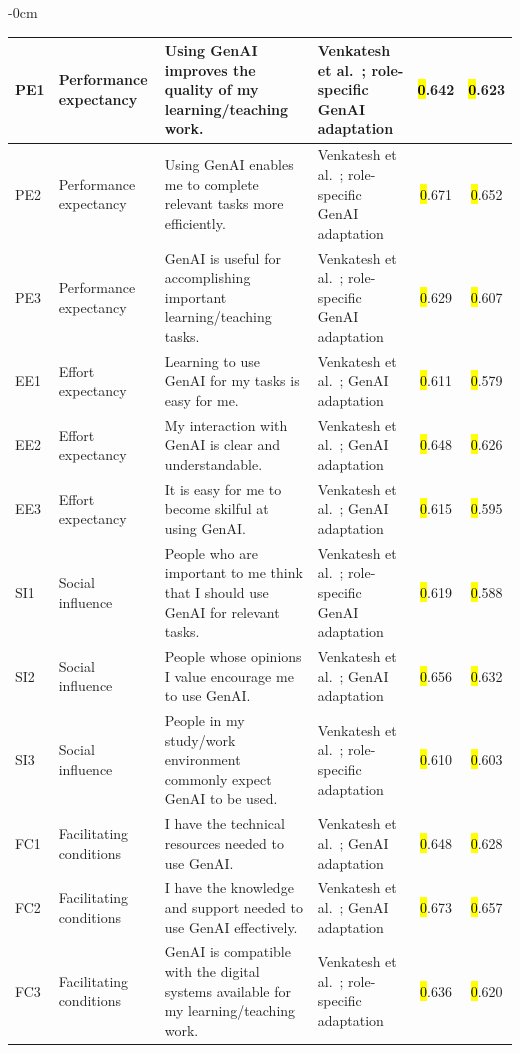 \documentclass[sustainability,article,accept,moreauthors]{Definitions/mdpi}
\begin{document}
\begin{table}[H]
\begin{adjustwidth}{-\extralength}{0cm}
\begin{tabular}{p{1.2cm}p{4cm}p{5cm}p{4cm}cc}
PE1 & Performance expectancy & Using GenAI improves the quality of my learning/teaching work. & Venkatesh et al.~\cite{venkatesh2012}; role-specific GenAI adaptation &\hl{0}.642 &\hl{0}.623 \\\midrule
PE2 & Performance expectancy & Using GenAI enables me to complete relevant tasks more efficiently. & Venkatesh et al.~\cite{venkatesh2012}; role-specific GenAI adaptation &\hl{0}.671 &\hl{0}.652 \\\midrule
PE3 & Performance expectancy & GenAI is useful for accomplishing important learning/teaching tasks. & Venkatesh et al.~\cite{venkatesh2012}; role-specific GenAI adaptation &\hl{0}.629 &\hl{0}.607 \\\midrule





EE1 & Effort expectancy & Learning to use GenAI for my tasks is easy for me. & Venkatesh et al.~\cite{venkatesh2012}; GenAI adaptation &\hl{0}.611 &\hl{0}.579 \\\midrule
EE2 & Effort expectancy & My interaction with GenAI is clear and understandable. & Venkatesh et al.~\cite{venkatesh2012}; GenAI adaptation &\hl{0}.648 &\hl{0}.626 \\\midrule
EE3 & Effort expectancy & It is easy for me to become skilful at using GenAI. & Venkatesh et al.~\cite{venkatesh2012}; GenAI adaptation &\hl{0}.615 &\hl{0}.595 \\\midrule
SI1 & Social influence & People who are important to me think that I should use GenAI for relevant tasks. & Venkatesh et al.~\cite{venkatesh2012}; role-specific GenAI adaptation &\hl{0}.619 &\hl{0}.588 \\\midrule
SI2 & Social influence & People whose opinions I value encourage me to use GenAI. & Venkatesh et al.~\cite{venkatesh2012}; GenAI adaptation &\hl{0}.656 &\hl{0}.632 \\\midrule
SI3 & Social influence & People in my study/work environment commonly expect GenAI to be used. & Venkatesh et al.~\cite{venkatesh2012}; role-specific adaptation &\hl{0}.610 &\hl{0}.603 \\\midrule





FC1 & Facilitating conditions & I have the technical resources needed to use GenAI. & Venkatesh et al.~\cite{venkatesh2012}; GenAI adaptation &\hl{0}.648 &\hl{0}.628 \\\midrule
FC2 & Facilitating conditions & I have the knowledge and support needed to use GenAI effectively. & Venkatesh et al.~\cite{venkatesh2012}; GenAI adaptation &\hl{0}.673 &\hl{0}.657 \\\midrule
FC3 & Facilitating conditions & GenAI is compatible with the digital systems available for my learning/teaching work. & Venkatesh et al.~\cite{venkatesh2012}; role-specific adaptation &\hl{0}.636 &\hl{0}.620 \\\midrule





\end{tabular}
\end{adjustwidth}
\end{table}
\end{document}
